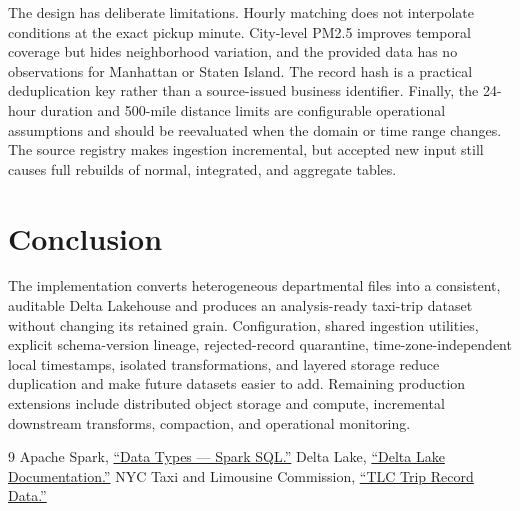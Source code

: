 \documentclass[10pt,a4paper]{article}
\begin{document}
The design has deliberate limitations. Hourly matching does not interpolate
conditions at the exact pickup minute. City-level PM2.5 improves temporal
coverage but hides neighborhood variation, and the provided data has no
observations for Manhattan or Staten Island. The record hash is a practical
deduplication key rather than a source-issued business identifier. Finally,
the 24-hour duration and 500-mile distance limits are configurable operational
assumptions and should be reevaluated when the domain or time range changes.
The source registry makes ingestion incremental, but accepted new input still
causes full rebuilds of normal, integrated, and aggregate tables.

\section{Conclusion}

The implementation converts heterogeneous departmental files into a
consistent, auditable Delta Lakehouse and produces an analysis-ready taxi-trip
dataset without changing its retained grain. Configuration, shared ingestion
utilities, explicit schema-version lineage, rejected-record quarantine,
time-zone-independent local timestamps, isolated transformations, and layered
storage reduce duplication and make future datasets easier to add. Remaining
production extensions include distributed object storage and compute,
incremental downstream transforms, compaction, and operational monitoring.

\begin{thebibliography}{9}
\small
{}
Apache Spark, \href{https://spark.apache.org/docs/latest/sql-ref-datatypes.html}
{``Data Types --- Spark SQL.''}
Delta Lake, \href{https://docs.delta.io/latest/index.html}
{``Delta Lake Documentation.''}
NYC Taxi and Limousine Commission,
\href{https://www.nyc.gov/site/tlc/about/tlc-trip-record-data.page}
{``TLC Trip Record Data.''}
\end{thebibliography}
\end{document}
